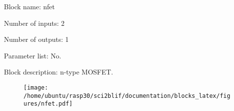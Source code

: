 \pagebreak
Block name: nfet

Number of inputs: 2

Number of outputs: 1

Parameter list: No.

Block description: 
n-type MOSFET.

\begin{figure}[H]  %
\texttt{[image: /home/ubuntu/rasp30/sci2blif/documentation/blocks\_latex/figures/nfet.pdf]}
\end{figure}

